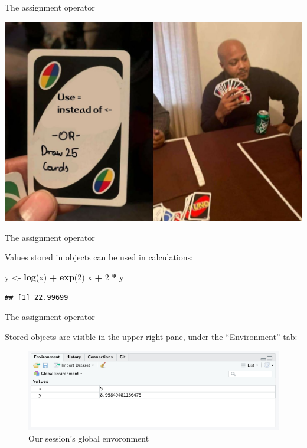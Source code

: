 \documentclass[ignorenonframetext,]{beamer}
\newenvironment{Shaded}{\begin{snugshade}}{\end{snugshade}}
\newcommand{\DecValTok}[1]{\textcolor[rgb]{0.00,0.00,0.81}{#1}}
\newcommand{\KeywordTok}[1]{\textcolor[rgb]{0.13,0.29,0.53}{\textbf{#1}}}
\newcommand{\NormalTok}[1]{#1}
\newcommand{\OperatorTok}[1]{\textcolor[rgb]{0.81,0.36,0.00}{\textbf{#1}}}
\newcommand{\StringTok}[1]{\textcolor[rgb]{0.31,0.60,0.02}{#1}}
\begin{document}
\begin{frame}{The assignment operator}
\protect\hypertarget{the-assignment-operator-2}{}

\includegraphics[scale=.22]{figures/meme}

\end{frame}

\begin{frame}[fragile]{The assignment operator}
\protect\hypertarget{the-assignment-operator-3}{}

Values stored in objects can be used in calculations:

\begin{Shaded}
\begin{Highlighting}[]
\NormalTok{y <-}\StringTok{ }\KeywordTok{log}\NormalTok{(x) }\OperatorTok{+}\StringTok{ }\KeywordTok{exp}\NormalTok{(}\DecValTok{2}\NormalTok{) }
\NormalTok{x }\OperatorTok{+}\StringTok{ }\DecValTok{2} \OperatorTok{*}\StringTok{ }\NormalTok{y}
\end{Highlighting}
\end{Shaded}

\begin{verbatim}
## [1] 22.99699
\end{verbatim}

\end{frame}

\begin{frame}{The assignment operator}
\protect\hypertarget{the-assignment-operator-4}{}

Stored objects are visible in the upper-right pane, under the
``Environment'' tab:

\begin{figure}
\includegraphics[scale=.45]{figures/objects}
\caption{Our session's global envoronment}
\end{figure}

\end{frame}
\end{document}
